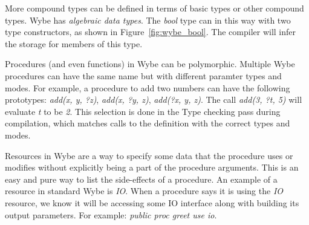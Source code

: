 More compound types can be defined in terms of basic types or other compound
types. Wybe has \textit{algebraic data types}. The \textit{bool} type can in
this way with two type constructors, as shown in
Figure~\ref{fig:wybe_bool}. The compiler will infer the storage for members of
this type. 


Procedures (and even functions) in Wybe can be polymorphic. Multiple Wybe
procedures can have the same name but with different paramter types and
modes. For example, a procedure to add two numbers can have the following
prototypes: \textit{add(x, y, ?z)}, \textit{add(x, ?y, z)}, \textit{add(?x, y,
  z)}. The call \textit{add(3, ?t, 5)} will evaluate \textit{t} to be
\textit{2}. This selection is done in the Type checking pass during
compilation, which matches calls to the definition with the correct types and
modes.

Resources in Wybe are a way to specify some data that the procedure uses or
modifies without explicitly being a part of the procedure arguments. This is an
easy and pure way to list the side-effects of a procedure. An example of a
resource in standard Wybe is \textit{IO}. When a procedure says it is using the
\textit{IO} resource, we know it will be accessing some IO interface along with
building its output parameters. For example: \textit{public proc greet use
  io}.




